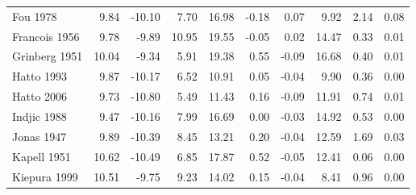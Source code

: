 \documentclass[12pt]{article}
\begin{document}
\begin{table}[H]
\begin{tabular}{lrrrrrrrrr}
\rowcolor{gray!6}  Fou 1978 & 9.84 & -10.10 & 7.70 & 16.98 & -0.18 & 0.07 & 9.92 & 2.14 & 0.08\\
\addlinespace
Francois 1956 & 9.78 & -9.89 & 10.95 & 19.55 & -0.05 & 0.02 & 14.47 & 0.33 & 0.01\\
\rowcolor{gray!6}  Grinberg 1951 & 10.04 & -9.34 & 5.91 & 19.38 & 0.55 & -0.09 & 16.68 & 0.40 & 0.01\\
Hatto 1993 & 9.87 & -10.17 & 6.52 & 10.91 & 0.05 & -0.04 & 9.90 & 0.36 & 0.00\\
\rowcolor{gray!6}  Hatto 2006 & 9.73 & -10.80 & 5.49 & 11.43 & 0.16 & -0.09 & 11.91 & 0.74 & 0.01\\
Indjic 1988 & 9.47 & -10.16 & 7.99 & 16.69 & 0.00 & -0.03 & 14.92 & 0.53 & 0.00\\
\addlinespace
\rowcolor{gray!6}  Jonas 1947 & 9.89 & -10.39 & 8.45 & 13.21 & 0.20 & -0.04 & 12.59 & 1.69 & 0.03\\
Kapell 1951 & 10.62 & -10.49 & 6.85 & 17.87 & 0.52 & -0.05 & 12.41 & 0.06 & 0.00\\
\rowcolor{gray!6}  Kiepura 1999 & 10.51 & -9.75 & 9.23 & 14.02 & 0.15 & -0.04 & 8.41 & 0.96 & 0.00\\
\bottomrule
\end{tabular}
\end{table}
\end{document}

